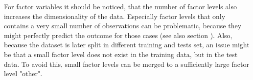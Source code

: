 For factor variables it should be noticed, that the number of factor levels also increases the dimensionality of the data. Especially factor levels that only contains a very small number of observations can be problematic, because they might perfectly predict the outcome for those cases (see also section ). Also, because the dataset is later split in different training and tests set, an issue might be that a small factor level does not exist in the training data, but in the test data. To avoid this, small factor levels can be merged to a sufficiently large factor level "other". 